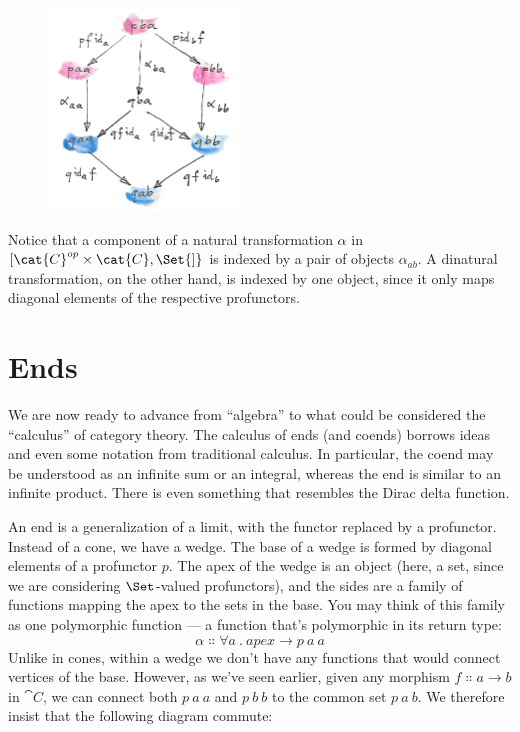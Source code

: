 \begin{figure}[H]
\centering
\includegraphics[width=50mm]{images/end-1.jpg}
\end{figure}

\noindent
Notice that a component of a natural transformation $\alpha$ in
${[}\cat{C}^{op}\times{}\cat{C}, \Set{]}$ is indexed by a pair of objects
$\alpha_{a b}$. A dinatural transformation, on the other hand, is
indexed by one object, since it only maps diagonal elements of the
respective profunctors.

\section{Ends}

We are now ready to advance from ``algebra'' to what could be considered
the ``calculus'' of category theory. The calculus of ends (and coends)
borrows ideas and even some notation from traditional calculus. In
particular, the coend may be understood as an infinite sum or an
integral, whereas the end is similar to an infinite product. There is
even something that resembles the Dirac delta function.

An end is a generalization of a limit, with the functor replaced by a
profunctor. Instead of a cone, we have a wedge. The base of a wedge is
formed by diagonal elements of a profunctor $p$. The apex of the
wedge is an object (here, a set, since we are considering
$\Set$-valued profunctors), and the sides are a family of
functions mapping the apex to the sets in the base. You may think of
this family as one polymorphic function --- a function that's
polymorphic in its return type:
\[\alpha \Colon \forall a\ .\ apex \to p\ a\ a\]
Unlike in cones, within a wedge we don't have any functions that would
connect vertices of the base. However, as we've seen earlier, given any
morphism $f \Colon a \to b$ in $\cat{C}$, we can connect both
$p\ a\ a$ and $p\ b\ b$ to the common set
$p\ a\ b$. We therefore insist that the following diagram
commute:

